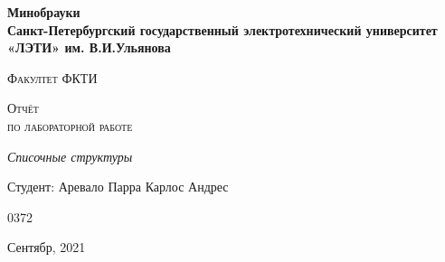 \begin{titlepage}
  \centering
  {\bfseries\LARGE
  Минобрауки\\
  Санкт-Петербургский государственный электротехнический
  университет «ЛЭТИ» им. В.И.Ульянова \par}
  \vspace{1cm}
  {\scshape\Large Факултет ФКТИ \par}
  \vspace{3cm}
  {\scshape\Large Отчёт \\по лабораторной работе\\\par}
  \vspace{1.5cm}
  {\itshape\Large Списочные структуры \par}
  \vfill
  {\Large Студент: Аревало Парра Карлос Андрес \par}
  \vfill
  {\large 0372}
  \vfill
  {\Large Сентябр, 2021 \par}
\end{titlepage}
